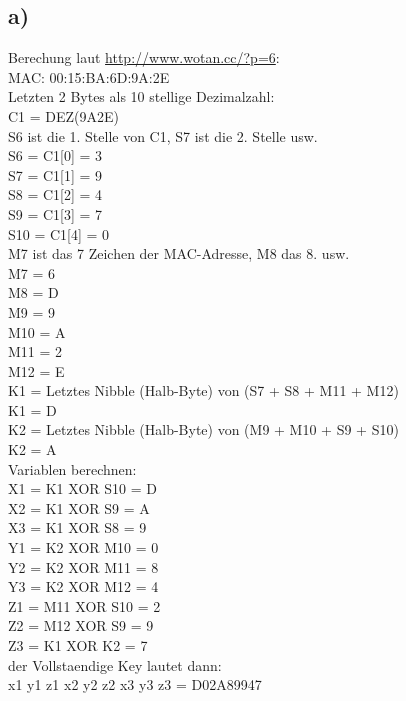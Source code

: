 \documentclass[10pt,a4paper]{article}
\begin{document}
\subsection*{a)}
Berechung laut \href{http://www.wotan.cc/?p=6}{http://www.wotan.cc/?p=6}:\\
MAC: 00:15:BA:6D:9A:2E\\
Letzten 2 Bytes als 10 stellige Dezimalzahl:\\
C1 = DEZ(9A2E)\\
 
S6 ist die 1. Stelle von C1, S7 ist die 2. Stelle usw.\\
S6 = C1[0] = 3 \\
S7 = C1[1] = 9 \\
S8 = C1[2] = 4 \\
S9 = C1[3] = 7 \\
S10 = C1[4] = 0 \\
 
M7 ist das 7 Zeichen der MAC-Adresse, M8 das 8. usw.\\
M7 =  6 \\
M8 =  D \\
M9 =  9 \\
M10 =  A \\
M11 =  2 \\
M12 =  E \\

K1 = Letztes Nibble (Halb-Byte) von (S7 + S8 + M11 + M12)\\
K1 =  D \\

K2 = Letztes Nibble (Halb-Byte) von (M9 + M10 + S9 + S10)\\
K2 =  A \\

Variablen berechnen:\\
X1 = K1  XOR S10 =  D \\
X2 = K1  XOR S9  =  A \\
X3 = K1  XOR S8  =  9 \\
Y1 = K2  XOR M10 =  0 \\
Y2 = K2  XOR M11 =  8 \\
Y3 = K2  XOR M12 =  4 \\
Z1 = M11 XOR S10 =  2 \\
Z2 = M12 XOR S9  =  9 \\
Z3 = K1  XOR K2  =  7 \\
 
der Vollstaendige Key lautet dann:\\
x1 y1 z1 x2 y2 z2 x3 y3 z3 = D02A89947 \\\\
\end{document}
